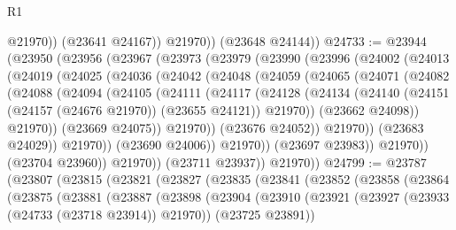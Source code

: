 \begin{lexlean}{R1}
\begin{coremodule}
                @21970))
            (@23641 @24167))
          @21970))
      (@23648 @24144))
@24733 := @23944
    (@23950
      (@23956
        (@23967
          (@23973
            (@23979
              (@23990
                (@23996
                  (@24002
                    (@24013
                      (@24019
                        (@24025
                          (@24036
                            (@24042
                              (@24048
                                (@24059
                                  (@24065
                                    (@24071
                                      (@24082
                                        (@24088
                                          (@24094
                                            (@24105
                                              (@24111
                                                (@24117
                                                  (@24128
                                                    (@24134
                                                      (@24140
                                                        (@24151
                                                          (@24157 (@24676 @21970))
                                                          (@23655 @24121))
                                                        @21970))
                                                    (@23662 @24098))
                                                  @21970))
                                              (@23669 @24075))
                                            @21970))
                                        (@23676 @24052))
                                      @21970))
                                  (@23683 @24029))
                                @21970))
                            (@23690 @24006))
                          @21970))
                      (@23697 @23983))
                    @21970))
                (@23704 @23960))
              @21970))
          (@23711 @23937))
        @21970))
@24799 := @23787
    (@23807
      (@23815
        (@23821
          (@23827
            (@23835
              (@23841
                (@23852
                  (@23858
                    (@23864
                      (@23875
                        (@23881
                          (@23887
                            (@23898
                              (@23904
                                (@23910
                                  (@23921
                                    (@23927 (@23933 (@24733 (@23718 @23914)) @21970))
                                    (@23725 @23891))

\end{coremodule}
\end{lexlean}
